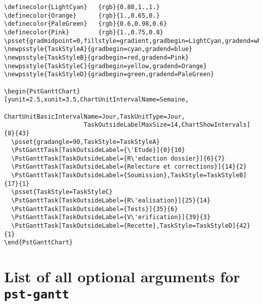\documentclass[11pt,english,BCOR10mm,DIV12,bibliography=totoc,parskip=false,smallheadings
    headexclude,footexclude,oneside]{pst-doc}
\begin{document}
\begin{lstlisting}
\definecolor{LightCyan}   {rgb}{0.88,1.,1.}
\definecolor{Orange}      {rgb}{1.,0.65,0.}
\definecolor{PaleGreen}   {rgb}{0.6,0.98,0.6}
\definecolor{Pink}        {rgb}{1.,0.75,0.8}
\psset{gradmidpoint=0,fillstyle=gradient,gradbegin=LightCyan,gradend=white}
\newpsstyle{TaskStyleA}{gradbegin=cyan,gradend=blue}
\newpsstyle{TaskStyleB}{gradbegin=red,gradend=Pink}
\newpsstyle{TaskStyleC}{gradbegin=yellow,gradend=Orange}
\newpsstyle{TaskStyleD}{gradbegin=green,gradend=PaleGreen}

\begin{PstGanttChart}[yunit=2.5,xunit=3.5,ChartUnitIntervalName=Semaine,
                      ChartUnitBasicIntervalName=Jour,TaskUnitType=Jour,
                      TaskOutsideLabelMaxSize=14,ChartShowIntervals]{8}{43}
  \psset{gradangle=90,TaskStyle=TaskStyleA}
  \PstGanttTask[TaskOutsideLabel={\'Etude}]{0}{10}
  \PstGanttTask[TaskOutsideLabel={R\'edaction dossier}]{6}{7}
  \PstGanttTask[TaskOutsideLabel={Relecture et corrections}]{14}{2}
  \PstGanttTask[TaskOutsideLabel={Soumission},TaskStyle=TaskStyleB]{17}{1}
  \psset{TaskStyle=TaskStyleC}
  \PstGanttTask[TaskOutsideLabel={R\'ealisation}]{25}{14}
  \PstGanttTask[TaskOutsideLabel={Tests}]{35}{6}
  \PstGanttTask[TaskOutsideLabel={V\'erification}]{39}{3}
  \PstGanttTask[TaskOutsideLabel={Recette},TaskStyle=TaskStyleD]{42}{1}
\end{PstGanttChart}
\end{lstlisting}

\section{List of all optional arguments for \texttt{pst-gantt}}


\bgroup
\raggedright
\nocite{*}


\egroup

\printindex
\end{document}
